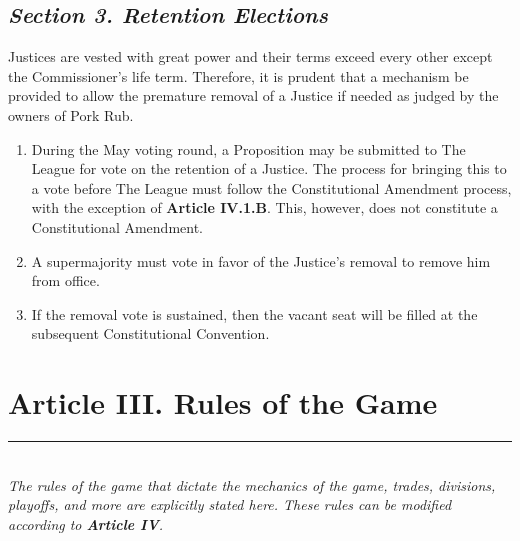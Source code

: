 \documentclass{article}
\begin{document}
    \subsection{\textit{Section 3. Retention Elections}}
    Justices are vested with great power and their terms exceed every other except the Commissioner’s life term. Therefore, it is prudent that a mechanism be provided to allow the premature removal of a Justice if needed as judged by the owners of Pork Rub.
    \begin{enumerate}[label=\Alph*)]
        \item During the May voting round, a Proposition may be submitted to The League for vote on the retention of a Justice. The process for bringing this to a vote before The League must follow the Constitutional Amendment process, with the exception of \textbf{Article IV.1.B}. This, however, does not constitute a Constitutional Amendment.
        \item A supermajority must vote in favor of the Justice’s removal to remove him from office.
        \item If the removal vote is sustained, then the vacant seat will be filled at the subsequent Constitutional Convention.
    \end{enumerate}
\section{Article III. Rules of the Game}
    \noindent\rule{\textwidth}{0.5pt}\\

    \noindent\textit{The rules of the game that dictate the mechanics of the game, trades, divisions, playoffs, and more are explicitly stated here. These rules can be modified according to \textbf{Article IV}.}
\end{document}
